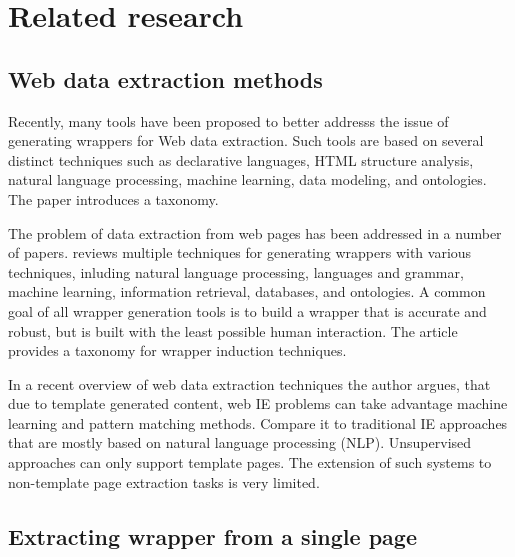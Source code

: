\chapter{Related research}




\section{Web data extraction methods}

\cite{Laender:2002:BSW:565117.565137} Recently, many tools have been proposed to better addresss the issue of generating wrappers for Web data extraction. Such tools are based on several distinct techniques such as declarative languages, HTML structure analysis, natural language processing, machine learning, data modeling, and ontologies. The paper introduces a taxonomy.

The problem of data extraction from web pages has been addressed in a number of papers. \cite{Laender:2002:BSW:565117.565137} reviews multiple techniques for generating wrappers with various techniques, inluding natural language processing, languages and grammar, machine learning, information retrieval, databases, and ontologies. A common goal of all wrapper generation tools is to build a wrapper that is accurate and robust, but is built with the least possible human interaction. The article provides a taxonomy for wrapper induction techniques.

In a recent overview of web data extraction techniques \cite{Chang:2006:SWI:1159162.1159300} the author argues, that due to template generated content, web IE problems can take advantage machine learning and pattern matching methods. Compare it to traditional IE approaches that are mostly based on natural language processing (NLP). Unsupervised approaches can only support template pages. The extension of such systems to non-template page extraction tasks is very limited.


\section{Extracting wrapper from a single page}

